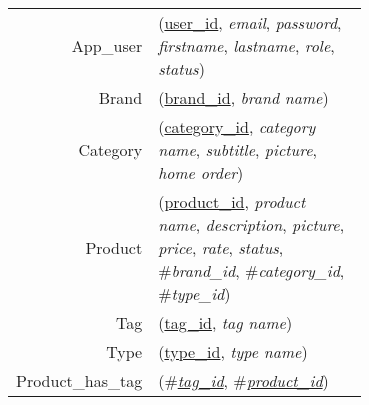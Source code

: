
\usepackage[normalem]{ulem}
\newenvironment{mld}
  {\par\begin{minipage}{\linewidth}\begin{tabular}{rp{0.7\linewidth}}}
  {\end{tabular}\end{minipage}\par}
\newcommand{\relat}[1]{\textsc{#1}}
\newcommand{\attr}[1]{\emph{#1}}
\newcommand{\prim}[1]{\uline{#1}}
\newcommand{\foreign}[1]{\#\textsl{#1}}


\begin{mld}
  App\_user & (\prim{user\_id}, \attr{email}, \attr{password}, \attr{firstname}, \attr{lastname}, \attr{role}, \attr{status})\\
  Brand & (\prim{brand\_id}, \attr{brand name})\\
  Category & (\prim{category\_id}, \attr{category name}, \attr{subtitle}, \attr{picture}, \attr{home order})\\
  Product & (\prim{product\_id}, \attr{product name}, \attr{description}, \attr{picture}, \attr{price}, \attr{rate}, \attr{status}, \foreign{brand\_id}, \foreign{category\_id}, \foreign{type\_id})\\
  Tag & (\prim{tag\_id}, \attr{tag name})\\
  Type & (\prim{type\_id}, \attr{type name})\\
  Product\_has\_tag & (\foreign{\prim{tag\_id}}, \foreign{\prim{product\_id}})\\
\end{mld}